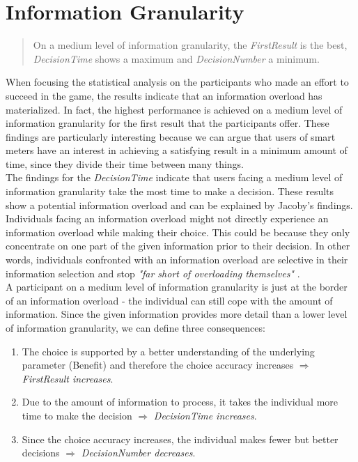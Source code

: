 \section{Information Granularity}
\begin{quote}
On a medium level of information granularity, the \textit{FirstResult} is the best, \textit{DecisionTime} shows a maximum and \textit{DecisionNumber} a minimum.
\end{quote}
When focusing the statistical analysis on the participants who made an effort to succeed in the game, the results indicate that an information overload has materialized. In fact, the highest performance is achieved on a medium level of information granularity for the first result that the participants offer. These findings are particularly interesting because we can argue that users of smart meters have an interest in achieving a satisfying result in a minimum amount of time, since they divide their time between many things.\\
The findings for the \textit{DecisionTime} indicate that users facing a medium level of information granularity take the most time to make a decision. These results show a potential information overload and can be explained by Jacoby's findings.\\ 
Individuals facing an information overload might not directly experience an information overload while making their choice. This could be because they only concentrate on one part of the given information prior to their decision. In other words, individuals confronted with an information overload are selective in their information selection and stop \textit{"far short of overloading themselves"} \citep{Jacoby1984}.\\
A participant on a medium level of information granularity is just at the border of an information overload - the individual can still cope with the amount of information. Since the given information provides more detail than a lower level of information granularity, we can define three consequences:
\begin{enumerate}
\item The choice is supported by a better understanding of the underlying parameter (Benefit) and therefore the choice accuracy increases $\Rightarrow$ \textit{FirstResult increases}.
\item Due to the amount of information to process, it takes the individual more time to make the decision $\Rightarrow$ \textit{DecisionTime increases}.
\item Since the choice accuracy increases, the individual makes fewer but better decisions $\Rightarrow$ \textit{DecisionNumber decreases}.
\end{enumerate}
